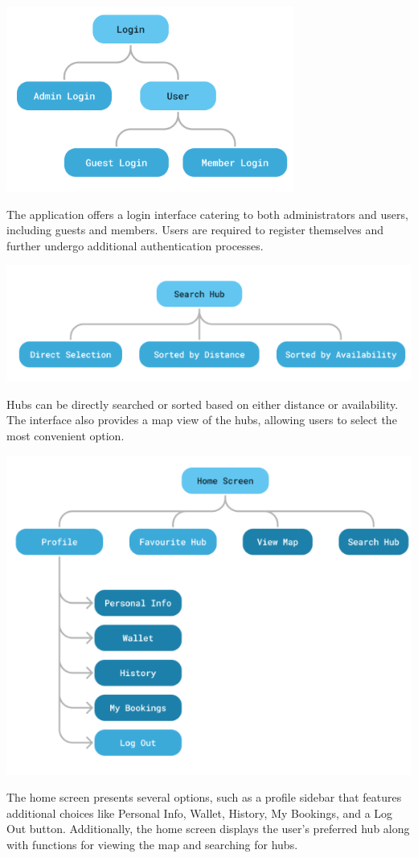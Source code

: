 \documentclass[11pt]{article}
\begin{document}
\begin{center}
    \includegraphics*{login-interface.png}
\end{center}
The application offers a login interface catering to both administrators and users, including guests and members. Users are required to register themselves and further undergo additional authentication processes.

\begin{center}
    \includegraphics*{search-interface.png}
\end{center}
Hubs can be directly searched or sorted based on either distance or availability. The interface also provides a map view of the hubs, allowing users to select the most convenient option.

\begin{center}
    \includegraphics*[scale=0.75]{home-screen-interface.png}
\end{center}
The home screen presents several options, such as a profile sidebar that features additional choices like Personal Info, Wallet, History, My Bookings, and a Log Out button. Additionally, the home screen displays the user's preferred hub along with functions for viewing the map and searching for hubs.
\end{document}
